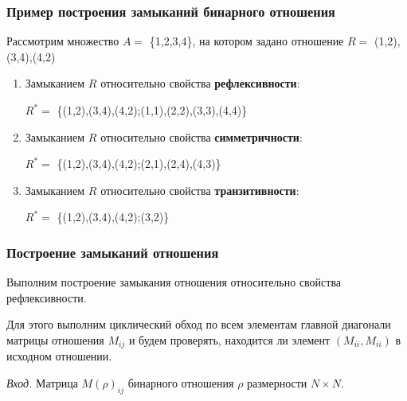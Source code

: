 \documentclass[bachelor, och, labwork]{shiza}
\begin{document}
\subsubsection{Пример построения замыканий бинарного отношения}

Рассмотрим множество $A=$ \{1,2,3,4\}, на котором задано отношение 
$R=$ {(1,2),(3,4),(4,2)} 

\begin{enumerate}

    \item Замыканием $R$ относительно свойства \textbf{рефлексивности}:
        \begin{center}

            $R^*=$ \{(1,2),(3,4),(4,2);(1,1),(2,2),(3,3),(4,4)\} 
        
        \end{center}
  
    \item Замыканием $R$ относительно свойства \textbf{симметричности}: 
        \begin{center}
    
            $R^*=$ \{(1,2),(3,4),(4,2);(2,1),(2,4),(4,3)\} 
    
        \end{center}
  
    \item Замыканием $R$ относительно свойства \textbf{транзитивности}: 
        \begin{center}
        
            $R^*=$ \{(1,2),(3,4),(4,2);(3,2)\} 
        
        \end{center}

\end{enumerate}



\subsubsection{Построение замыканий отношения}

Выполним построение замыкания отношения относительно свойства 
рефлексивности.

Для этого выполним циклический обход по всем элементам главной диагонали 
матрицы отношения $M_{ij}$ и будем проверять, находится ли элемент 
$(M_{ii},M_{ii})$ в исходном отношении.

\textit{Вход.} Матрица $M(\rho)_{ij}$ бинарного отношения $\rho$ размерности
$N \times N$.
\end{document}
